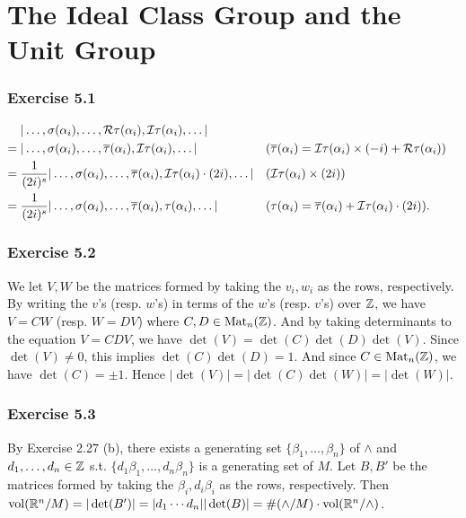 \documentclass[../Marcus.tex]{subfiles}
\begin{document}
\chapter{The Ideal Class Group and the Unit Group}

\subsection*{Exercise 5.1}

\begin{align*}
&|\ldots,\sigma(\alpha_i),\ldots,\mathcal{R}\tau(\alpha_i),\mathcal{I}\tau(\alpha_i),\ldots|     \\
={} &|\ldots,\sigma(\alpha_i),\ldots,\overline{\tau}(\alpha_i),\mathcal{I}\tau(\alpha_i),\ldots|  
&&(\overline{\tau}(\alpha_i) = \mathcal{I} \tau(\alpha_i) \times (-i) + \mathcal{R} \tau(\alpha_i))       \\
={} &\frac{1}{(2i)^s} |\ldots,\sigma(\alpha_i),\ldots,\overline{\tau}(\alpha_i),\mathcal{I}\tau(\alpha_i)\cdot(2i),\ldots| 
&&(\mathcal{I} \tau(\alpha_i) \times (2i))    \\
={} &\frac{1}{(2i)^s} |\ldots,\sigma(\alpha_i),\ldots,\overline{\tau}(\alpha_i),\tau(\alpha_i),\ldots|  
&&(\tau(\alpha_i) = \overline{\tau}(\alpha_i) + \mathcal{I}\tau(\alpha_i)\cdot(2i)).
\end{align*}

\subsection*{Exercise 5.2}

We let $V,W$ be the matrices formed by taking the $v_i,w_i$ as the rows, respectively. By writing the $v$'s (resp. $w$'s) in terms of the $w$'s (resp. $v$'s) over $\mathbb{Z}$, we have $V=CW$ (resp. $W=DV$) where $C,D \in \operatorname{Mat}_n(\mathbb{Z})$. And by taking determinants to the equation $V=CDV$, we have $\det(V) = \det(C)\det(D)\det(V)$. Since $\det(V)\neq0$, this implies $\det(C)\det(D)=1$. And since $C \in \operatorname{Mat}_n(\mathbb{Z})$, we have $\det(C)=\pm1$. Hence $|\det(V)| = |\det(C) \det(W)| = |\det(W)|$.

\subsection*{Exercise 5.3}

By Exercise 2.27 (b), there exists a generating set $\{\beta_1,\ldots,\beta_n\}$ of $\wedge$ and $d_1,\ldots,d_n \in \mathbb{Z}$ s.t. $\{d_1\beta_1,\ldots,d_n\beta_n\}$ is a generating set of $M$. Let $B,B'$ be the matrices formed by taking the $\beta_i,d_i\beta_i$ as the rows, respectively. Then $\operatorname{vol}(\mathbb{R}^n/M) = |\det(B')| = |d_1\cdots d_n| |\det(B)| = \#(\wedge/M) \cdot \operatorname{vol}(\mathbb{R}^n/\wedge)$.
\end{document}
